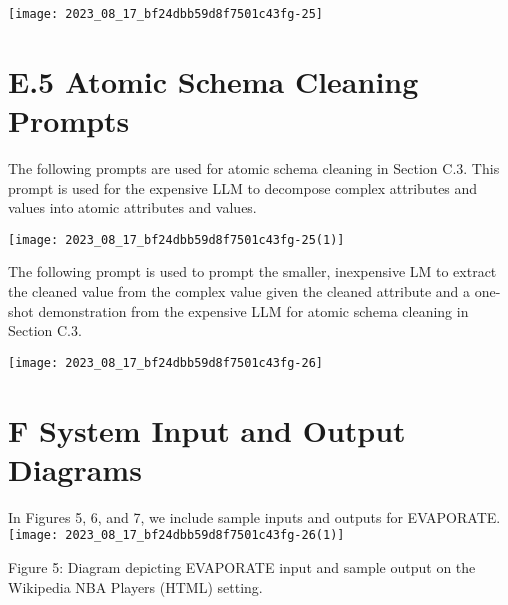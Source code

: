 \documentclass[10pt]{article}
\begin{document}
\begin{center}
\texttt{[image: 2023\_08\_17\_bf24dbb59d8f7501c43fg-25]}
\end{center}

\section{E.5 Atomic Schema Cleaning Prompts}
The following prompts are used for atomic schema cleaning in Section C.3. This prompt is used for the expensive LLM to decompose complex attributes and values into atomic attributes and values.

\begin{center}
\texttt{[image: 2023\_08\_17\_bf24dbb59d8f7501c43fg-25(1)]}
\end{center}

The following prompt is used to prompt the smaller, inexpensive LM to extract the cleaned value from the complex value given the cleaned attribute and a one-shot demonstration from the expensive LLM for atomic schema cleaning in Section C.3.

\begin{center}
\texttt{[image: 2023\_08\_17\_bf24dbb59d8f7501c43fg-26]}
\end{center}

\section{F System Input and Output Diagrams}
In Figures 5, 6, and 7, we include sample inputs and outputs for EVAPORATE.
\texttt{[image: 2023\_08\_17\_bf24dbb59d8f7501c43fg-26(1)]}

Figure 5: Diagram depicting EVAPORATE input and sample output on the Wikipedia NBA Players (HTML) setting.
\end{document}
